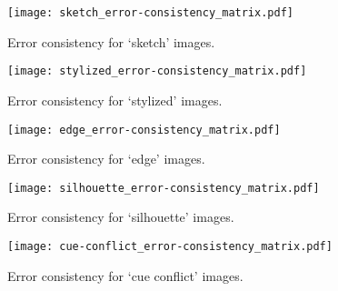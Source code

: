 \begin{figure}
	\centering
	\texttt{[image: sketch\_error-consistency\_matrix.pdf]}
	\caption{Error consistency for `sketch' images.}
	\label{fig:error_consistency_matrix_sketch}
\end{figure}

\begin{figure}
    \centering
    \texttt{[image: stylized\_error-consistency\_matrix.pdf]}
    \caption{Error consistency for `stylized' images.}
    \label{fig:error_consistency_matrix_stylized}
\end{figure}

\begin{figure}
	\centering
	\texttt{[image: edge\_error-consistency\_matrix.pdf]}
	\caption{Error consistency for `edge' images.}
	\label{fig:error_consistency_matrix_edges}
\end{figure}

\begin{figure}
	\centering
	\texttt{[image: silhouette\_error-consistency\_matrix.pdf]}
	\caption{Error consistency for `silhouette' images.}
	\label{fig:error_consistency_matrix_silhouettes}
\end{figure}

\begin{figure}
	\centering
	\texttt{[image: cue-conflict\_error-consistency\_matrix.pdf]}
	\caption{Error consistency for `cue conflict' images.}
	\label{fig:error_consistency_matrix_cue-conflict}
\end{figure}

